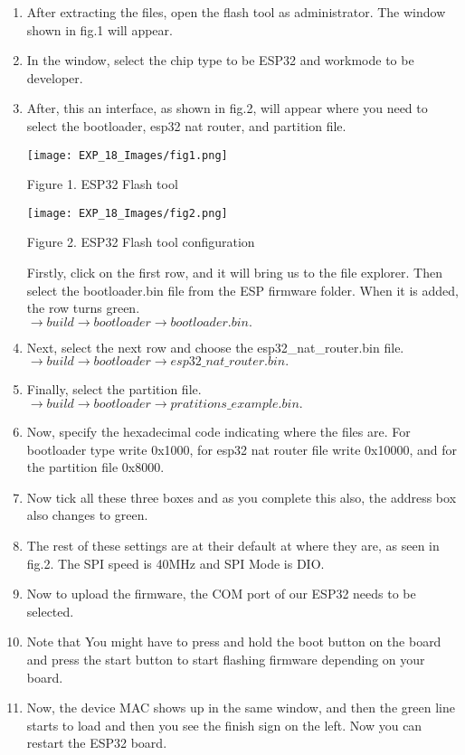 \documentclass[12pt,a4paper]{article}
\begin{document}
\begin{justify}
\begin{enumerate}
\item After extracting the files, open the flash tool as administrator. The window shown in fig.1 will appear.
\item In the window, select the chip type to be ESP32 and workmode to be developer.
\item After, this an interface, as shown in fig.2, will appear where you need to select the bootloader, esp32 nat router, and partition file.
\begin{center} 
\texttt{[image: EXP\_18\_Images/fig1.png]}
\end{center}
\begin{center} {Figure 1. ESP32 Flash tool  }\end{center}
\begin{center} 
\texttt{[image: EXP\_18\_Images/fig2.png]}
\end{center}
\begin{center} {Figure 2. ESP32 Flash tool configuration }\end{center}

\noindent Firstly, click on the first row, and it will bring us to the file explorer. Then select the bootloader.bin file from the ESP firmware folder. When it is added, the row turns green.\\
$\rightarrow build  \rightarrow  bootloader \rightarrow bootloader.bin.$
\item Next, select the next row and choose the esp32\_nat\_router.bin file.\\
$\rightarrow build \rightarrow  bootloader \rightarrow esp32\_nat\_router.bin.$
\item Finally, select the partition file.\\
$\rightarrow build  \rightarrow bootloader \rightarrow pratitions\_example.bin.$
\item Now, specify the hexadecimal code indicating where the files are. For bootloader type write 0x1000, for esp32 nat router file write 0x10000, and for the partition file 0x8000.
\item Now tick all these three boxes and as you complete this also, the address box also changes to green.
\item The rest of these settings are at their default at where they are, as seen in fig.2. The SPI speed is 40MHz and SPI Mode is DIO.
\item Now to upload the firmware, the COM port of our ESP32 needs to be selected.
\item Note that You might have to press and hold the boot button on the board and press the start button to start flashing firmware depending on your board.
\item Now, the device MAC shows up in the same window, and then the green line starts to load and then you see the finish sign on the left. Now you can restart the ESP32 board.
\end{enumerate}


\end{justify}
\end{document}
